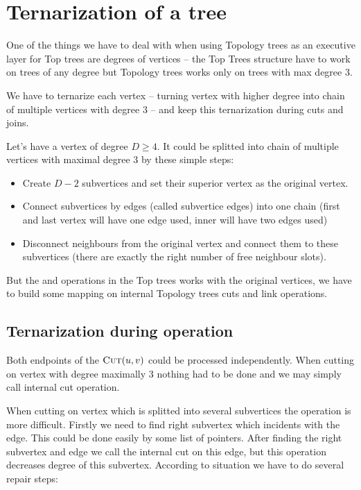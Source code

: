 \section{Ternarization of a tree}

One of the things we have to deal with when using Topology trees as an executive
layer for Top trees are degrees of vertices -- the Top Trees structure have to
work on trees of any degree but Topology trees works only on trees with max
degree 3.

We have to {\I ternarize} each vertex -- turning vertex with higher degree into
chain of multiple vertices with degree 3 -- and keep this ternarization during
cuts and joins.

Let's have a vertex of degree $D\ge4$. It could be splitted into chain of
multiple vertices with maximal degree 3 by these simple steps:
\begin{itemize}
\item Create $D - 2$ {\I subvertices} and set their {\I superior vertex} as the
original vertex.
\item Connect subvertices by edges (called {\I subvertice edges}) into one chain (first
and last vertex will have one edge used, inner will have two edges used)
\item Disconnect neighbours from the original vertex and connect them to these
subvertices (there are exactly the right number of free neighbour slots).
\end{itemize}

But the \Cut{} and \Link{} operations in the Top trees works with the original
vertices, we have to build some mapping on internal Topology trees cuts and link
operations.

\subsection{Ternarization during \Cut{} operation}

Both endpoints of the $\hbox{\sc Cut}(u,v)$ could be processed independently. When cutting on
vertex with degree maximally 3 nothing had to be done and we may simply call
internal cut operation.

When cutting on vertex which is splitted into several subvertices the operation
is more difficult. Firstly we need to find right subvertex which incidents with
the edge. This could be done easily by some list of pointers. After finding the
right subvertex and edge we call the internal cut on this edge, but this
operation decreases degree of this subvertex. According to situation we have to
do several repair steps:

